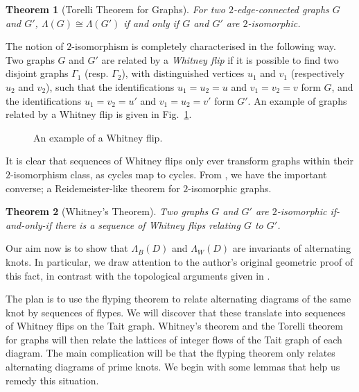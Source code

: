 \documentclass[12pt]{report}
\newtheorem*{theorem}{Theorem}
\theoremstyle{upright}
\begin{document}
\begin{theorem}[Torelli Theorem for Graphs]
For two $2$-edge-connected graphs $G$ and $G'$, $\Lambda(G) \cong \Lambda(G')$ if and only if $G$ and $G'$ are $2$-isomorphic.
\end{theorem}

The notion of $2$-isomorphism is completely characterised in the following way. Two graphs $G$ and $G'$ are related by a \textit{Whitney flip} if it is possible to find two disjoint graphs $\Gamma_{1}$ (resp. $\Gamma_{2}$), with distinguished vertices $u_{1}$ and $v_{1}$ (respectively $u_{2}$ and $v_{2}$), such that the identifications $u_{1} = u_{2} = u$ and $v_{1} = v_{2} = v$ form $G$, and the identifications $u_{1} = v_{2} = u'$ and $v_{1} = u_{2} = v'$ form $G'$. An example of graphs related by a Whitney flip is given in Fig.~\ref{fig:whitney_flip}.

\begin{figure}[hbt!]
	\centering
	\def\svgscale{0.5}
	
	
	\caption{An example of a Whitney flip.}
	\label{fig:whitney_flip}
\end{figure}

It is clear that sequences of Whitney flips only ever transform graphs within their $2$-isomorphism class, as cycles map to cycles. From \cite{2-isomorphic-graphs}, we have the important converse; a Reidemeister-like theorem for $2$-isomorphic graphs.

\begin{theorem}[Whitney's Theorem]
Two graphs $G$ and $G'$ are $2$-isomorphic if-and-only-if there is a sequence of Whitney flips relating $G$ to $G'$.
\end{theorem}

Our aim now is to show that $\Lambda_{B}(D)$ and $\Lambda_{W}(D)$ are invariants of alternating knots.  In particular, we draw attention to the author's original geometric proof of this fact, in contrast with the topological arguments given in \cite{lattices-graphs-mutation}.

The plan is to use the flyping theorem to relate alternating diagrams of the same knot by sequences of flypes.  We will discover that these translate into sequences of Whitney flips on the Tait graph. Whitney's theorem and the Torelli theorem for graphs will then relate the lattices of integer flows of the Tait graph of each diagram. The main complication will be that the flyping theorem only relates alternating diagrams of prime knots. We begin with some lemmas that help us remedy this situation.
\end{document}
